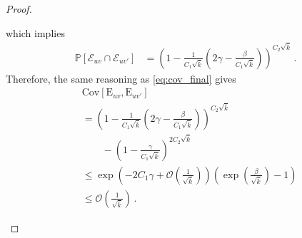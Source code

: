 \documentclass[journal]{IEEEtran}
\newcommand{\Cov}{\mathrm{Cov}}
\theoremstyle{definition}
\theoremstyle{definition}
\newcommand{\Ec}{\mathcal{E}}
\newcommand{\PP}{\mathbb{P}}
\newcommand{\rE}{\mathrm{E}}
\newcommand{\kb}{\overline{k}}
\newcommand{\bigO}{\mathcal{O}}
\begin{document}
\begin{proof}
\begin{enumerate}
        which implies
\begin{align*}
    \PP[\Ec_{uv} \cap \Ec_{uv'}] 
    &= \left( 1 - \frac{1}{C_1 \sqrt{\kb}} \left( 2\gamma 
       - \frac{\beta}{C_1 \sqrt{\kb}} \right) \right)^{C_2 \sqrt{\kb}} \,.
\end{align*}
Therefore, the same reasoning as \eqref{eq:cov_final} gives
\begin{align*}
    &\Cov[\rE_{uv}, \rE_{uv'}] \\
    &= \left( 1 - \frac{1}{C_1 \sqrt{\kb}} \left( 2\gamma 
       - \frac{\beta}{C_1 \sqrt{\kb}} \right) \right)^{C_2 \sqrt{\kb}} \\
    &\qquad - \left( 1 - \frac{\gamma}{C_1 \sqrt{\kb}} 
       \right)^{2 C_2 \sqrt{\kb}} \\
    &\leq \exp\left( - 2 C_1 \gamma 
       + \bigO \left(\frac{1}{\sqrt{\kb}}\right) \right) 
       \left( \exp\left( \frac{\beta}{\sqrt{\kb}} \right) - 1 \right) \\
    &\leq \bigO\left( \frac{1}{\sqrt{\kb}} \right) \,.
\end{align*}
	\end{enumerate}
	

\end{proof}
\end{document}
